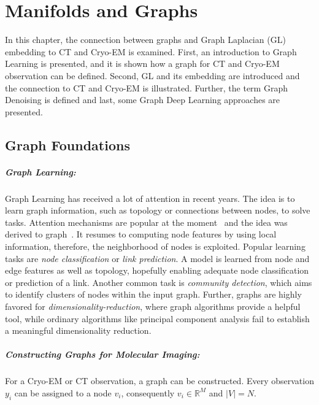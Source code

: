 \chapter{Manifolds and Graphs}
\label{sec:manifold_and_graphs}
    
In this chapter, the connection between graphs and Graph Laplacian (GL) embedding to 
CT and Cryo-EM is examined. 
First, an introduction to Graph Learning is presented, and it is shown how a graph
for CT and Cryo-EM observation can be defined.
Second, GL and its embedding are introduced and the connection to CT and Cryo-EM is illustrated.
Further, the term Graph Denoising is defined and last, some Graph Deep Learning approaches are presented.


\section{Graph Foundations}

\paragraph{Graph Learning:} 
Graph Learning has received a lot of attention in recent years.
The idea is to learn graph information, such as topology or connections between nodes, to solve tasks.
Attention mechanisms are popular at the moment~\cite{transformer} and the idea was derived to graph~\cite{GAT}.
It resumes to computing node features by using local information, therefore, the neighborhood of nodes is exploited.
Popular learning tasks are \textit{node classification} or \textit{link prediction}. 
A model is learned from node and edge features as well as topology, hopefully enabling adequate node classification
or prediction of a link.
Another common task is \textit{community detection}, which aims to identify clusters of nodes within the input graph.
Further, graphs are highly favored for \textit{dimensionality-reduction}, where 
graph algorithms provide a helpful tool, while ordinary algorithms like principal component analysis fail to 
establish a meaningful dimensionality reduction.


\paragraph{Constructing Graphs for Molecular Imaging:}
For a Cryo-EM or CT observation, a graph can be constructed.
Every observation $y_i$ can be assigned to a node $v_i$, consequently $v_i \in \mathbb{R}^M$ and $|V|=N$.

